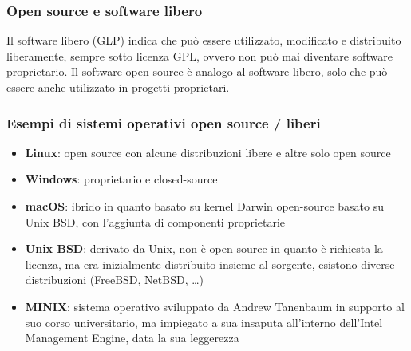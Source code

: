 \documentclass[a4paper]{article}
\begin{document}
\subsubsection*{Open source e software libero}
Il software libero (GLP) indica che può essere utilizzato, modificato e distribuito liberamente, sempre sotto licenza GPL, ovvero
non può mai diventare software proprietario. Il software open source è analogo al software libero, solo che può essere anche
utilizzato in progetti proprietari.

\subsubsection*{Esempi di sistemi operativi open source / liberi}
\begin{itemize}
	\item \textbf{Linux}: open source con alcune distribuzioni libere e altre solo open source
	\item \textbf{Windows}: proprietario e closed-source
	\item \textbf{macOS}: ibrido in quanto basato su kernel Darwin open-source basato su Unix BSD, con l'aggiunta di componenti proprietarie
	\item \textbf{Unix BSD}: derivato da Unix, non è open source in quanto è richiesta la licenza, ma era inizialmente distribuito
	insieme al sorgente, esistono diverse distribuzioni (FreeBSD, NetBSD, \dots)
	\item \textbf{MINIX}: sistema operativo sviluppato da Andrew Tanenbaum in supporto al suo corso universitario, ma impiegato
	a sua insaputa all'interno dell'Intel Management Engine, data la sua leggerezza
\end{itemize}

\newpage
\end{document}
